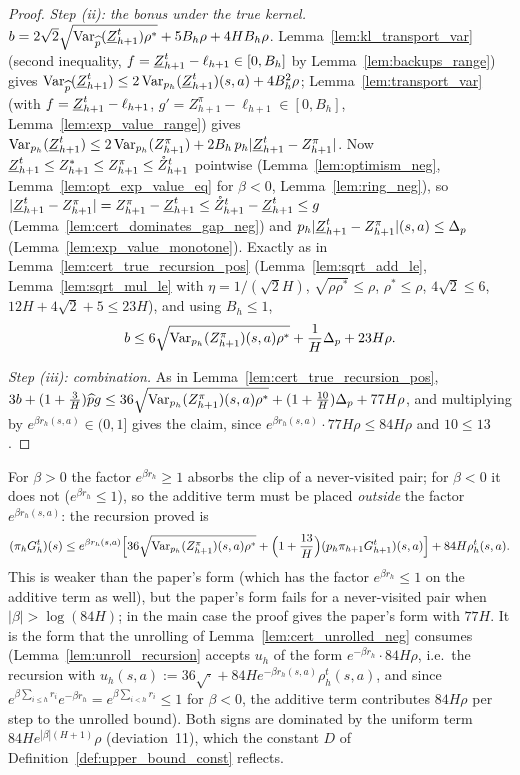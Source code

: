 \begin{proof}
\emph{Step (ii): the bonus under the true kernel.} $b = 2\sqrt2\sqrt{\operatorname{Var}_{\widehat{p}}(\underline{Z}^t_{h+1})\rho^*} + 5B_h\rho + 4HB_h\rho$.
Lemma~\ref{lem:kl_transport_var} (second inequality, $f = \underline{Z}^t_{h+1} - \ell_{h+1} \in [0, B_h]$ by
Lemma~\ref{lem:backups_range}) gives $\operatorname{Var}_{\widehat{p}}(\underline{Z}^t_{h+1}) \le 2\operatorname{Var}_{p_h}(\underline{Z}^t_{h+1})(s,a) + 4B_h^2\rho$;
Lemma~\ref{lem:transport_var} (with $f = \underline{Z}^t_{h+1} - \ell_{h+1}$, $g' = Z^\pi_{h+1} - \ell_{h+1} \in [0, B_h]$,
Lemma~\ref{lem:exp_value_range}) gives $\operatorname{Var}_{p_h}(\underline{Z}^t_{h+1}) \le 2\operatorname{Var}_{p_h}(Z^\pi_{h+1}) + 2B_h\,p_h\lvert \underline{Z}^t_{h+1} - Z^\pi_{h+1} \rvert$.
Now $\underline{Z}^t_{h+1} \le Z^*_{h+1} \le Z^\pi_{h+1} \le \mathring{Z}^t_{h+1}$ pointwise (Lemma~\ref{lem:optimism_neg},
Lemma~\ref{lem:opt_exp_value_eq} for $\beta < 0$, Lemma~\ref{lem:ring_neg}), so
$\lvert \underline{Z}^t_{h+1} - Z^\pi_{h+1} \rvert = Z^\pi_{h+1} - \underline{Z}^t_{h+1} \le \mathring{Z}^t_{h+1} - \underline{Z}^t_{h+1} \le g$
(Lemma~\ref{lem:cert_dominates_gap_neg}) and $p_h\lvert \underline{Z}^t_{h+1} - Z^\pi_{h+1} \rvert(s,a) \le \Delta_p$
(Lemma~\ref{lem:exp_value_monotone}). Exactly as in Lemma~\ref{lem:cert_true_recursion_pos}
(Lemma~\ref{lem:sqrt_add_le}, Lemma~\ref{lem:sqrt_mul_le} with $\eta = 1/(\sqrt2H)$, $\sqrt{\rho\rho^*} \le \rho$,
$\rho^* \le \rho$, $4\sqrt2 \le 6$, $12H + 4\sqrt2 + 5 \le 23H$), and using $B_h \le 1$,
\[
  b \le 6\sqrt{\operatorname{Var}_{p_h}(Z^\pi_{h+1})(s,a)\rho^*} + \frac1H\Delta_p + 23H\rho .
\]

\emph{Step (iii): combination.} As in Lemma~\ref{lem:cert_true_recursion_pos},
$3b + (1 + \frac3H)\widehat{p} g \le 36\sqrt{\operatorname{Var}_{p_h}(Z^\pi_{h+1})(s,a)\rho^*} + (1 + \frac{10}{H})\Delta_p + 77H\rho$,
and multiplying by $e^{\beta r_h(s,a)} \in (0, 1]$ gives the claim, since
$e^{\beta r_h(s,a)}\cdot 77H\rho \le 84H\rho$ and $10 \le 13$.
\end{proof}

\begin{remark}\label{rem:neg_additive_term}
For $\beta > 0$ the factor $e^{\beta r_h} \ge 1$ absorbs the clip of a never-visited pair; for $\beta < 0$
it does not ($e^{\beta r_h} \le 1$), so the additive term must be placed \emph{outside} the factor
$e^{\beta r_h(s,a)}$: the recursion proved is
\[
  (\pi_hG_h^t)(s) \le e^{\beta r_h(s,a)}\Big[36\sqrt{\operatorname{Var}_{p_h}(Z^\pi_{h+1})(s,a)\rho^*} + \Big(1 + \frac{13}{H}\Big)(p_h\pi_{h+1}G^t_{h+1})(s,a)\Big] + 84H\rho^t_h(s,a) .
\]
This is weaker than the paper's form (which has the factor $e^{\beta r_h} \le 1$ on the additive term
as well), but the paper's form fails for a never-visited pair when $|\beta| > \log(84H)$; in the
main case the proof gives the paper's form with $77H$. It is the form that the unrolling of Lemma~\ref{lem:cert_unrolled_neg} consumes
(Lemma~\ref{lem:unroll_recursion} accepts $u_h$ of the form $e^{-\beta r_h}\cdot 84H\rho$, i.e.\ the
recursion with $u_h(s,a) := 36\sqrt{\cdot} + 84He^{-\beta r_h(s,a)}\rho^t_h(s,a)$, and since
$e^{\beta\sum_{i \le h}r_i}e^{-\beta r_h} = e^{\beta\sum_{i < h}r_i} \le 1$ for $\beta < 0$, the additive term
contributes $84H\rho$ per step to the unrolled bound). Both signs are dominated
by the uniform term $84He^{|\beta|(H+1)}\rho$ (deviation~11), which the constant $D$ of
Definition~\ref{def:upper_bound_const} reflects.
\end{remark}


